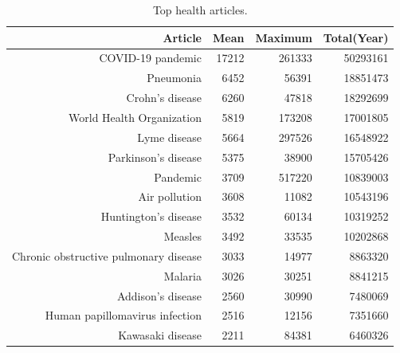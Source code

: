 \begin{table}[t!h]
\centering
\caption{Top health articles.\label{tab:health}} 
\begingroup\small
\begin{tabular}{rrrr}
  \toprule
Article & Mean & Maximum & Total(Year) \\ 
  \midrule
COVID-19 pandemic & 17212 & 261333 & 50293161 \\ 
  Pneumonia & 6452 & 56391 & 18851473 \\ 
  Crohn's disease & 6260 & 47818 & 18292699 \\ 
  World Health Organization & 5819 & 173208 & 17001805 \\ 
  Lyme disease & 5664 & 297526 & 16548922 \\ 
  Parkinson's disease & 5375 & 38900 & 15705426 \\ 
  Pandemic & 3709 & 517220 & 10839003 \\ 
  Air pollution & 3608 & 11082 & 10543196 \\ 
  Huntington's disease & 3532 & 60134 & 10319252 \\ 
  Measles & 3492 & 33535 & 10202868 \\ 
  Chronic obstructive pulmonary disease & 3033 & 14977 & 8863320 \\ 
  Malaria & 3026 & 30251 & 8841215 \\ 
  Addison's disease & 2560 & 30990 & 7480069 \\ 
  Human papillomavirus infection & 2516 & 12156 & 7351660 \\ 
  Kawasaki disease & 2211 & 84381 & 6460326 \\ 
   \bottomrule
\end{tabular}
\endgroup
\end{table}
